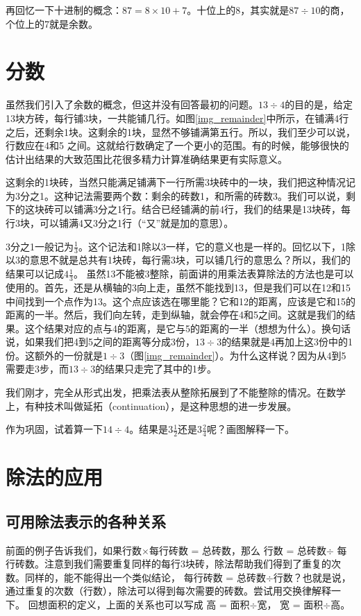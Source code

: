 再回忆一下十进制的概念：$87 = 8\times10+7$。十位上的8，其实就是$87\div10$的商，个位上的7就是余数。

\section{分数} 虽然我们引入了余数的概念，但这并没有回答最初的问题。$13\div4$的目的是，给定13块方砖，每行铺3块，一共能铺几行。如图\ref{img_remainder}中所示，在铺满4行之后，还剩余1块。这剩余的1块，显然不够铺满第五行。所以，我们至少可以说，行数应在4和5 之间。这就给行数确定了一个更小的范围。有的时候，能够很快的估计出结果的大致范围比花很多精力计算准确结果更有实际意义。

这剩余的1块砖，当然只能满足铺满下一行所需3块砖中的一块，我们把这种情况记为3分之1。这种记法需要两个数：剩余的砖数1，和所需的砖数3。我们可以说，剩下的这块砖可以铺满3分之1行。结合已经铺满的前4行，我们的结果是13块砖，每行3块，可以铺满4又3分之1行（“又”就是加的意思）。

3分之1一般记为$\frac{1}{3}$。这个记法和1除以3一样，它的意义也是一样的。回忆以下，1除以3的意思不就是总共有1块砖，每行需3块，可以铺几行的意思么？所以，我们的结果可以记成$4\frac{1}{3}$。
虽然13不能被3整除，前面讲的用乘法表算除法的方法也是可以使用的。首先，还是从横轴的3向上走，虽然不能找到13，但是我们可以在12和15中间找到一个点作为13。这个点应该选在哪里能？它和12的距离，应该是它和15的距离的一半。然后，我们向左转，走到纵轴，就会停在4和5之间。这就是我们的结果。这个结果对应的点与4的距离，是它与5的距离的一半（想想为什么）。换句话说，如果我们把4到5之间的距离等分成3份，$13\div3$的结果就是4再加上这3份中的1份。这额外的一份就是$1\div3$（图\ref{img_remainder}）。为什么这样说？因为从4到5需要走3步，而$13\div3$的结果只走完了其中的1步。

我们刚才，完全从形式出发，把乘法表从整除拓展到了不能整除的情况。在数学上，有种技术叫做延拓（continuation），是这种思想的进一步发展。

作为巩固，试着算一下$14\div4$。结果是$3\frac{1}{2}$还是$3\frac{2}{4}$呢？画图解释一下。

\section{除法的应用}
\subsection{可用除法表示的各种关系}

前面的例子告诉我们，如果行数$\times$每行砖数 = 总砖数，那么
行数 = 总砖数$\div$ 每行砖数。注意到我们需要重复同样的每行3块砖，除法帮助我们得到了重复的次数。同样的，能不能得出一个类似结论， 每行砖数 = 总砖数$\div$行数？也就是说，通过重复的次数（行数），除法可以得到每次需要的砖数。尝试用交换律解释一下。 回想面积的定义，上面的关系也可以写成 高 = 面积$\div$宽， 宽 = 面积$\div$高。

